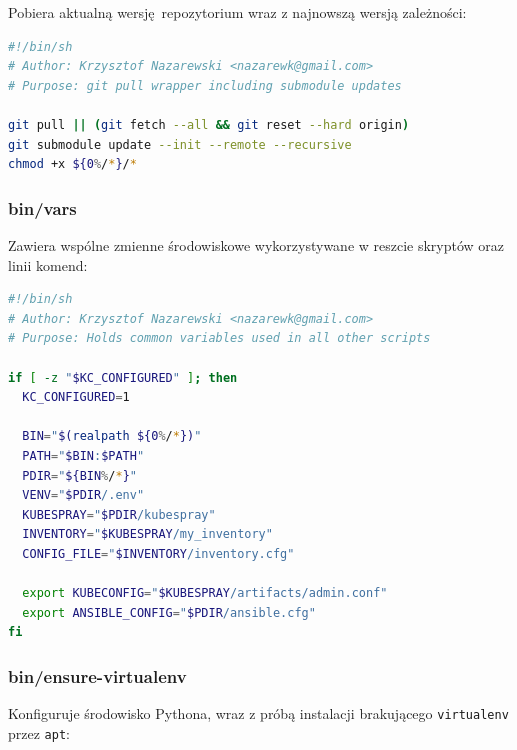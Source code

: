 \documentclass[a4paper,12pt,twoside,openany]{report}
\newcommand{\passthrough}[1]{#1}
\begin{document}
Pobiera aktualną wersję~repozytorium wraz z najnowszą wersją zależności:

\begin{lstlisting}[language=bash]
#!/bin/sh
# Author: Krzysztof Nazarewski <nazarewk@gmail.com>
# Purpose: git pull wrapper including submodule updates

git pull || (git fetch --all && git reset --hard origin)
git submodule update --init --remote --recursive
chmod +x ${0%/*}/*
\end{lstlisting}

\hypertarget{binvars}{%
\subsubsection{bin/vars}\label{binvars}}

Zawiera wspólne zmienne środowiskowe wykorzystywane w reszcie skryptów
oraz linii komend:

\begin{lstlisting}[language=bash]
#!/bin/sh
# Author: Krzysztof Nazarewski <nazarewk@gmail.com>
# Purpose: Holds common variables used in all other scripts

if [ -z "$KC_CONFIGURED" ]; then
  KC_CONFIGURED=1

  BIN="$(realpath ${0%/*})"
  PATH="$BIN:$PATH"
  PDIR="${BIN%/*}"
  VENV="$PDIR/.env"
  KUBESPRAY="$PDIR/kubespray"
  INVENTORY="$KUBESPRAY/my_inventory"
  CONFIG_FILE="$INVENTORY/inventory.cfg"

  export KUBECONFIG="$KUBESPRAY/artifacts/admin.conf"
  export ANSIBLE_CONFIG="$PDIR/ansible.cfg"
fi
\end{lstlisting}

\hypertarget{binensure-virtualenv}{%
\subsubsection{bin/ensure-virtualenv}\label{binensure-virtualenv}}

Konfiguruje środowisko Pythona, wraz z próbą instalacji brakującego
\passthrough{\lstinline!virtualenv!} przez
\passthrough{\lstinline!apt!}:
\end{document}
